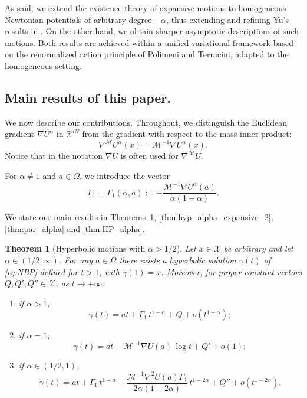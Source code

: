 \documentclass[a4paper,10pt]{amsart}
\theoremstyle{plain}
\newtheorem{thm}{Theorem}
\theoremstyle{definition}
\numberwithin{equation}{section}
\numberwithin{thm}{section}
\begin{document}
As said, we extend the existence theory of expansive motions to homogeneous Newtonian potentials of arbitrary degree $-\alpha$, thus extending and refining Yu's results in \cite{Yu_Hyperbolic}. On the other hand, we obtain sharper asymptotic descriptions of such motions. Both results are achieved within a unified variational framework based on the renormalized action principle of Polimeni and Terracini, adapted to the homogeneous setting.

\medskip

\subsection{Main results of this paper.}
We now describe our contributions. Throughout, we distinguish the Euclidean gradient $\nabla U^\alpha$ in $\mathbb{R}^{dN}$ from the gradient with respect to the mass inner product:
\[
\nabla^{\mathcal{M}}U^\alpha(x)=\mathcal{M}^{-1}\nabla U^\alpha(x).
\]
Notice that in \cite{MadernaVenturelli_HyperbolicMotions,PolimeniTerracini} the notation $\nabla U$ is often used for $\nabla^{\mathcal M}U$.

For $\alpha\neq 1$ and $a\in\Omega$, we introduce the vector
\begin{equation}\label{e:Gamma1}
\Gamma_1=\Gamma_1(\alpha,a):=-\frac{\mathcal{M}^{-1}\nabla U^\alpha(a)}{\alpha(1-\alpha)}.
\end{equation}

\medskip

\noindent
We state our main results in Theorems~\ref{thm:hyp_alpha_expansive_1}, \ref{thm:hyp_alpha_expansive_2}, \ref{thm:par_alpha} and \ref{thm:HP_alpha}.

\begin{thm}[Hyperbolic motions with $\alpha>1/2$]\label{thm:hyp_alpha_expansive_1}
Let $x\in\mathcal{X}$ be arbitrary and let $\alpha\in(1/2,\infty)$. For any $a\in\Omega$ there exists a hyperbolic solution $\gamma(t)$ of \eqref{eq:NBP} defined for $t>1$, with $\gamma(1)=x$. Moreover, for proper constant vectors $Q,Q',Q''\in\mathcal{X}$, as $t\to+\infty$:
\begin{enumerate}
\item if $\alpha>1$,
\[
\gamma(t)=at+\Gamma_1\,t^{1-\alpha}+Q+o(t^{1-\alpha});
\]
\item if $\alpha=1$,
\[
\gamma(t)=at-\mathcal{M}^{-1}\nabla U(a)\,\log t+Q'+o(1);
\]
\item if $\alpha\in(1/2,1)$,
\[
\gamma(t)
=
at+\Gamma_1\,t^{1-\alpha}
-\frac{\mathcal{M}^{-1}\nabla^2U(a)\Gamma_1}{2\alpha(1-2\alpha)}\,t^{1-2\alpha}
+Q''+o(t^{1-2\alpha}).
\]
\end{enumerate}
\end{thm}
\end{document}
